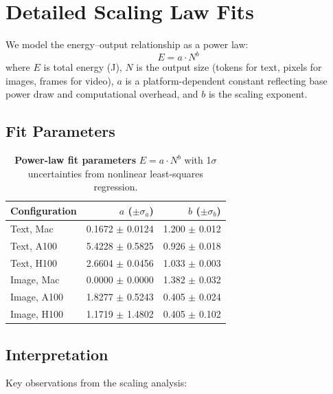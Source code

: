 \documentclass[11pt]{article}
\begin{document}
\section{Detailed Scaling Law Fits}

We model the energy--output relationship as a power law:
\begin{equation}
E = a \cdot N^b
\end{equation}
where $E$ is total energy (J), $N$ is the output size (tokens for text, pixels for images, frames for video), $a$ is a platform-dependent constant reflecting base power draw and computational overhead, and $b$ is the scaling exponent.

\subsection{Fit Parameters}

\begin{table}[H]
\centering
\caption{\textbf{Power-law fit parameters} $E = a \cdot N^b$ with 1$\sigma$ uncertainties from nonlinear least-squares regression.}
\begin{tabular}{lrr}
\toprule
Configuration & $a$ ($\pm \sigma_a$) & $b$ ($\pm \sigma_b$) \\
\midrule
Text, Mac & 0.1672 $\pm$ 0.0124 & 1.200 $\pm$ 0.012 \\
Text, A100 & 5.4228 $\pm$ 0.5825 & 0.926 $\pm$ 0.018 \\
Text, H100 & 2.6604 $\pm$ 0.0456 & 1.033 $\pm$ 0.003 \\
Image, Mac & 0.0000 $\pm$ 0.0000 & 1.382 $\pm$ 0.032 \\
Image, A100 & 1.8277 $\pm$ 0.5243 & 0.405 $\pm$ 0.024 \\
Image, H100 & 1.1719 $\pm$ 1.4802 & 0.405 $\pm$ 0.102 \\

\bottomrule
\end{tabular}
\label{tab:scaling}
\end{table}

\subsection{Interpretation}

Key observations from the scaling analysis:
\end{document}
